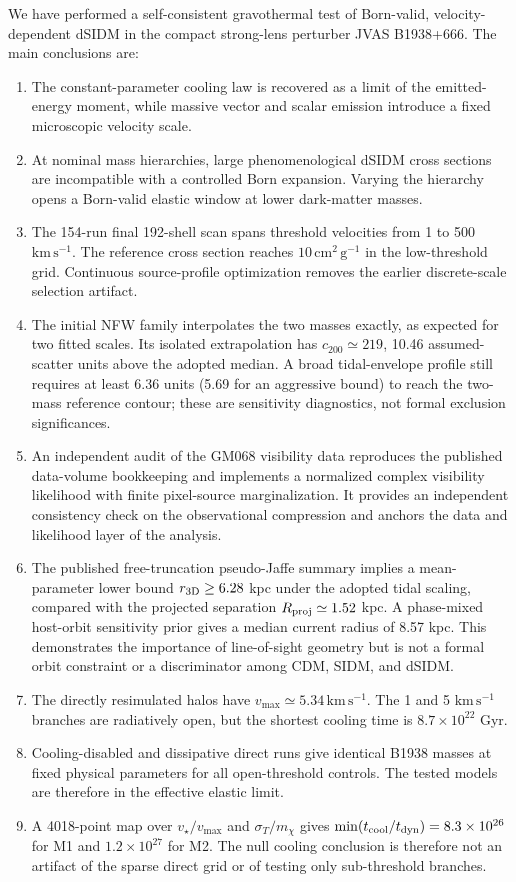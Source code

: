 \documentclass[12pt]{iopart}
\newcommand{\sigmavm}{\sigma_T/m_\chi}
\newcommand{\vstar}{v_\star}
\newcommand{\tcool}{t_{\rm cool}}
\newcommand{\tdyn}{t_{\rm dyn}}
\begin{document}
We have performed a self-consistent gravothermal test of Born-valid,
velocity-dependent dSIDM in the compact strong-lens perturber JVAS
B1938+666.  The main conclusions are:
\begin{enumerate}
  \item The constant-parameter cooling law is recovered as a limit of the
  emitted-energy moment, while massive vector and scalar emission introduce
  a fixed microscopic velocity scale.
  \item At nominal mass hierarchies, large phenomenological dSIDM cross
  sections are incompatible with a controlled Born expansion.  Varying the
  hierarchy opens a Born-valid elastic window at lower dark-matter masses.
  \item The 154-run final 192-shell scan spans threshold velocities from 1 to
  500 $\mathrm{km\,s^{-1}}$.  The reference cross section reaches
  $10\,\mathrm{cm^2\,g^{-1}}$ in the low-threshold grid.  Continuous
  source-profile optimization removes the earlier discrete-scale selection
  artifact.
  \item The initial NFW family interpolates the two masses exactly, as expected
  for two fitted scales.  Its isolated extrapolation has $c_{200}\simeq219$,
  10.46 assumed-scatter units above the adopted median.  A broad tidal-envelope
  profile still requires at least 6.36 units (5.69 for an aggressive bound) to
  reach the two-mass reference contour; these are sensitivity diagnostics,
  not formal exclusion significances.
  \item An independent audit of the GM068 visibility data reproduces
  the published data-volume bookkeeping and implements a normalized complex
  visibility likelihood with finite pixel-source marginalization.  It provides
  an independent consistency check on the observational compression and
  anchors the data and likelihood layer of the analysis.
  \item The published free-truncation pseudo-Jaffe summary implies a
  mean-parameter lower bound $r_{\rm 3D}\geq6.28$ kpc under the adopted tidal
  scaling, compared with the projected separation $R_{\rm proj}\simeq1.52$
  kpc.  A phase-mixed host-orbit sensitivity prior gives a median current
  radius of 8.57 kpc.  This demonstrates the importance of line-of-sight
  geometry but is not a formal orbit constraint or a discriminator among CDM,
  SIDM, and dSIDM.
  \item The directly resimulated halos have
  $v_{\max}\simeq5.34\,\mathrm{km\,s^{-1}}$.  The 1 and 5
  $\mathrm{km\,s^{-1}}$ branches are radiatively open, but the shortest
  cooling time is $8.7\times10^{22}$ Gyr.
  \item Cooling-disabled and dissipative direct runs give identical B1938
  masses at fixed physical parameters for all open-threshold controls.  The
  tested models are therefore in the effective elastic limit.
  \item A 4018-point map over $\vstar/v_{\max}$ and $\sigmavm$ gives
  $\min(\tcool/\tdyn)=8.3\times10^{26}$ for M1 and $1.2\times10^{27}$ for M2.
  The null cooling conclusion is therefore not an artifact of the sparse
  direct grid or of testing only sub-threshold branches.
\end{enumerate}
\end{document}
